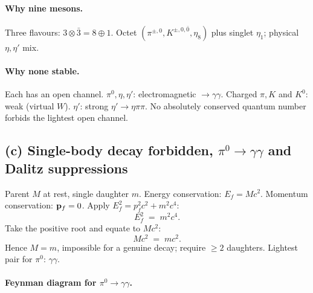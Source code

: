 \documentclass[11pt]{article}
\begin{document}
\paragraph{Why nine mesons.} Three flavours: $3\otimes\bar 3=8\oplus 1$. Octet $(\pi^{\pm,0},K^{\pm,0,\bar 0},\eta_{8})$ plus singlet $\eta_{1}$; physical $\eta,\eta'$ mix.

\paragraph{Why none stable.} Each has an open channel. $\pi^{0},\eta,\eta'$: electromagnetic $\to\gamma\gamma$. Charged $\pi,K$ and $K^{0}$: weak (virtual $W$). $\eta'$: strong $\eta'\to\eta\pi\pi$. No absolutely conserved quantum number forbids the lightest open channel.

\subsection*{(c) Single-body decay forbidden, $\pi^{0}\to\gamma\gamma$ and Dalitz suppressions}

Parent $M$ at rest, single daughter $m$. Energy conservation: $E_{f}=Mc^{2}$. Momentum conservation: $\vb p_{f}=0$.
Apply $E_{f}^{2}=p_{f}^{2}c^{2}+m^{2}c^{4}$:
\[
E_{f}^{2}\;=\;m^{2}c^{4}.
\]
Take the positive root and equate to $Mc^{2}$:
\[
Mc^{2}\;=\;mc^{2}.
\]
Hence $M=m$, impossible for a genuine decay; require $\geq 2$ daughters. Lightest pair for $\pi^{0}$: $\gamma\gamma$.

\paragraph{Feynman diagram for $\pi^{0}\to\gamma\gamma$.}
\begin{center}
\end{center}
\end{document}

